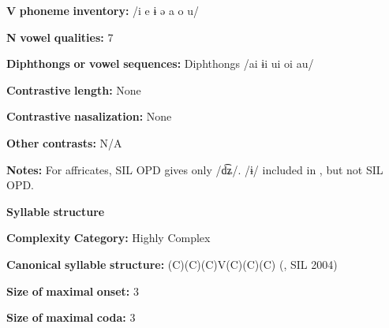 \begin{styleBody}
\textbf{V} \textbf{phoneme} \textbf{inventory:} /i e ɨ ə a o u/
\end{styleBody}

\begin{styleBody}
\textbf{N} \textbf{vowel} \textbf{qualities:} 7
\end{styleBody}

\begin{styleBody}
\textbf{Diphthongs} \textbf{or} \textbf{vowel} \textbf{sequences:} Diphthongs /ai ɨi ui oi au/
\end{styleBody}

\begin{styleBody}
\textbf{Contrastive} \textbf{length:} None
\end{styleBody}

\begin{styleBody}
\textbf{Contrastive} \textbf{nasalization:} None
\end{styleBody}

\begin{styleBody}
\textbf{Other} \textbf{contrasts:} N/A
\end{styleBody}

\begin{styleBody}
\textbf{Notes:} For affricates, SIL OPD gives only /d͡ʑ/. /ɨ/ included in \citealt{Bruce1984}, but not SIL OPD.
\end{styleBody}

\begin{styleBody}
\textbf{Syllable} \textbf{structure}
\end{styleBody}

\begin{styleBody}
\textbf{Complexity} \textbf{Category:} Highly Complex
\end{styleBody}

\begin{styleBody}
\textbf{Canonical} \textbf{syllable} \textbf{structure:} (C)(C)(C)V(C)(C)(C) (\citealt{Bruce1984}, SIL 2004)
\end{styleBody}

\begin{styleBody}
\textbf{Size} \textbf{of} \textbf{maximal} \textbf{onset:} 3
\end{styleBody}

\begin{styleBody}
\textbf{Size} \textbf{of} \textbf{maximal} \textbf{coda:} 3
\end{styleBody}

